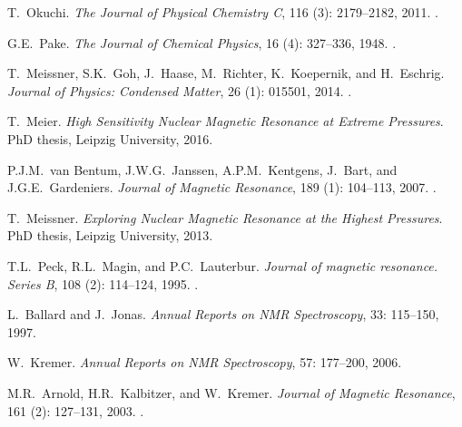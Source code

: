 \documentclass[aip,rsi,reprint,graphicx]{revtex4-1} %
\begin{document}
\begin{thebibliography}{57}
T.~Okuchi.
\newblock \emph{The Journal of Physical Chemistry C}, 116
  (3): 2179--2182, 2011.
\newblock {}.

G.E.~Pake.
\newblock \emph{The Journal of Chemical Physics}, 16 (4):
  327--336, 1948.
\newblock {}.

T.~Meissner, S.K.~Goh, J.~Haase, M.~Richter, K.~Koepernik, and H.~Eschrig.
\newblock \emph{Journal of Physics: Condensed Matter}, 26
  (1): 015501, 2014.
\newblock {}.

T.~Meier.
\newblock \emph{{High Sensitivity Nuclear Magnetic Resonance at Extreme
  Pressures}}.
\newblock PhD thesis, Leipzig University, 2016.

P.J.M.~van Bentum, J.W.G.~Janssen, A.P.M.~Kentgens, J.~Bart, and J.G.E.~Gardeniers.
\newblock \emph{Journal of Magnetic Resonance}, 189 (1):
  104--113, 2007.
\newblock {}.

T.~Meissner.
\newblock \emph{{Exploring Nuclear Magnetic Resonance at the Highest
  Pressures}}.
\newblock PhD thesis, Leipzig University, 2013.

T.L.~Peck, R.L.~Magin, and P.C.~Lauterbur.
\newblock \emph{Journal of magnetic resonance. Series B}, 108
  (2): 114--124, 1995.
\newblock {}.

L.~Ballard and J.~Jonas.
\newblock \emph{Annual Reports on NMR Spectroscopy}, 33: 115--150,
  1997.

W.~Kremer.
\newblock \emph{Annual Reports on NMR Spectroscopy}, 57: 177--200,
  2006.

M.R.~Arnold, H.R.~Kalbitzer, and W.~Kremer.
\newblock \emph{Journal of Magnetic Resonance}, 161 (2):
  127--131, 2003.
\newblock {}.

\end{thebibliography}
\end{document}
